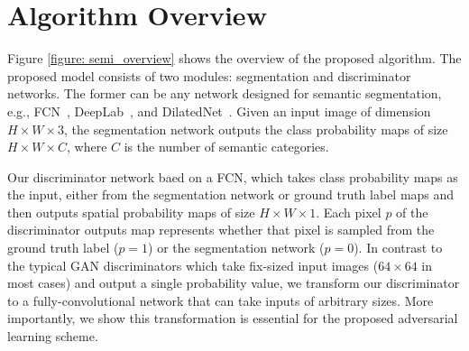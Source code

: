 \documentclass{bmvc2k}
\begin{document}
	\vspace{-2mm}
	\section{Algorithm Overview}
	\vspace{-2mm}
	
	Figure \ref{figure: semi_overview} shows the overview of the proposed algorithm.
	The proposed model consists of two modules: segmentation and discriminator networks.
	The former can be any network designed for semantic segmentation, e.g., FCN~\cite{fcn}, DeepLab~\cite{deeplab}, and DilatedNet~\cite{dilated}.
	Given an input image of dimension $H \times W \times 3$, the segmentation network outputs the class probability maps of size $H \times W \times C$, where $C$ is the number of semantic categories.
	
	Our discriminator network baed on a FCN, which takes class probability maps as the input, either from the segmentation network or ground truth label maps and then outputs spatial probability maps of size $H \times W \times 1$.
	Each pixel $p$ of the discriminator outputs map represents whether that pixel is sampled from the ground truth label ($p=1$) or the segmentation network ($p=0$).
	In contrast to the typical GAN discriminators which take fix-sized input images ($64 \times 64$ in most cases) and output a single probability value, we transform our discriminator to a fully-convolutional network that can take inputs of arbitrary sizes.
	More importantly, we show this transformation is essential for the proposed adversarial learning scheme.
	
\end{document}
